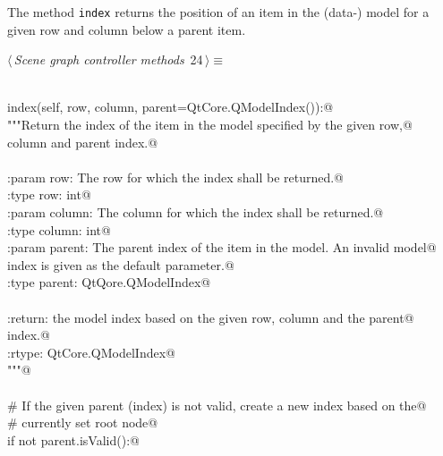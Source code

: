 \documentclass[
    a4paper,      %
    10pt,         %
    openright,    %
    notitlepage,  %
    parskip=half, %
]{scrreprt}       %
\theoremstyle{definition}                    %
\begin{document}
The method \verb+index+ returns the position of an item in the (data-) model for
a given row and column below a parent item.

\begin{flushleft} \small
\begin{minipage}{\linewidth}\label{scrap19}\raggedright\small
{} $\langle\,${\itshape Scene graph controller methods}\nobreak\ {\footnotesize {24}}$\,\rangle\equiv$
\vspace{-1ex}
\begin{list}{}{} \item
\mbox{}\lstinline@@\\
\mbox{}\lstinline@def index(self, row, column, parent=QtCore.QModelIndex()):@\\
\mbox{}\lstinline@    """Return the index of the item in the model specified by the given row,@\\
\mbox{}\lstinline@    column and parent index.@\\
\mbox{}\lstinline@@\\
\mbox{}\lstinline@    :param row: The row for which the index shall be returned.@\\
\mbox{}\lstinline@    :type  row: int@\\
\mbox{}\lstinline@    :param column: The column for which the index shall be returned.@\\
\mbox{}\lstinline@    :type column: int@\\
\mbox{}\lstinline@    :param parent: The parent index of the item in the model. An invalid model@\\
\mbox{}\lstinline@                   index is given as the default parameter.@\\
\mbox{}\lstinline@    :type parent: QtQore.QModelIndex@\\
\mbox{}\lstinline@@\\
\mbox{}\lstinline@    :return: the model index based on the given row, column and the parent@\\
\mbox{}\lstinline@             index.@\\
\mbox{}\lstinline@    :rtype: QtCore.QModelIndex@\\
\mbox{}\lstinline@    """@\\
\mbox{}\lstinline@@\\
\mbox{}\lstinline@    # If the given parent (index) is not valid, create a new index based on the@\\
\mbox{}\lstinline@    # currently set root node@\\
\mbox{}\lstinline@    if not parent.isValid():@\\

\end{list}
\end{minipage}
\end{flushleft}
\end{document}
